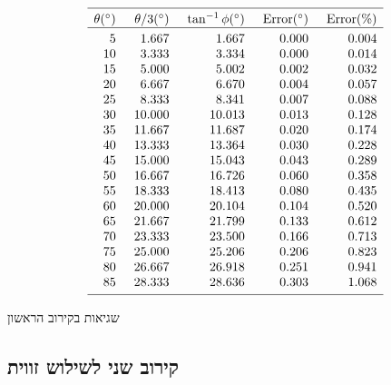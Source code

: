 \begin{table}[t]
\[
%
\begin{array}{r@{\hspace{5mm}}r@{\hspace{5mm}}r@{\hspace{5mm}}r@{\hspace{5mm}}r}
\hline
\noalign{\smallskip}
\theta ({}^\circ) & \theta/3 ({}^\circ)& \tan^{-1} \phi ({}^\circ) & \mathrm{Error} ({}^\circ) & \mathrm{Error (\%)}\\\hline
\noalign{\smallskip}
  5 &    1.667 &    1.667  &     0.000 &    0.004 \\
 10 &    3.333 &    3.334  &     0.000 &    0.014 \\
 15 &    5.000 &    5.002  &     0.002 &    0.032 \\
 20 &    6.667 &    6.670  &     0.004 &    0.057 \\
 25 &    8.333 &    8.341  &     0.007 &    0.088 \\
 30 &   10.000 &   10.013  &     0.013 &    0.128 \\
 35 &   11.667 &   11.687  &     0.020 &    0.174 \\
 40 &   13.333 &   13.364  &     0.030 &    0.228 \\
 45 &   15.000 &   15.043  &     0.043 &    0.289 \\
 50 &   16.667 &   16.726  &     0.060 &    0.358 \\
 55 &   18.333 &   18.413  &     0.080 &    0.435 \\
 60 &   20.000 &   20.104  &     0.104 &    0.520 \\
 65 &   21.667 &   21.799  &     0.133 &    0.612 \\
 70 &   23.333 &   23.500  &     0.166 &    0.713 \\
 75 &   25.000 &   25.206  &     0.206 &    0.823 \\
 80 &   26.667 &   26.918  &     0.251 &    0.941 \\
 85 &   28.333 &   28.636  &     0.303 &    1.068 \\
 \noalign{\smallskip}
 \hline
 \end{array}
\]
\caption{שגיאות בקירוב הראשון}\label{t.trisect-first}
\end{table}


\subsection{קירוב שני לשילוש זווית}

